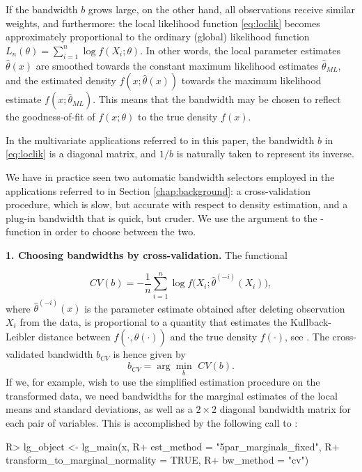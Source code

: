 If the bandwidth \(b\) grows large, on the other hand, all observations receive similar weights, and furthermore: the local likelihood function \eqref{eq:loclik} becomes approximately proportional to the ordinary (global) likelihood function \(L_n(\theta) = \sum_{i=1}^n\log f(X_i;\theta)\). In other words, the local parameter estimates \(\widehat \theta(x)\) are smoothed towards the constant maximum likelihood estimates \(\widehat\theta_{ML}\), and the estimated density \(f(x;\widehat\theta(x))\) towards the maximum likelihood estimate \(f(x;\widehat\theta_{ML})\). This means that the bandwidth may be chosen to reflect the goodness-of-fit of \(f(x;\theta)\) to the true density \(f(x)\).

In the multivariate applications referred to in this paper, the bandwidth \(b\) in \eqref{eq:loclik} is a diagonal matrix, and \(1/b\) is
naturally taken to represent its inverse. 

We have in practice seen two automatic bandwidth selectors employed in the applications referred to in Section \ref{chap:background}: a
cross-validation procedure, which is slow, but accurate with respect to density estimation, and a plug-in bandwidth that is quick, but cruder. We use the argument
 to the -function in order to choose between the two.

\textbf{1. Choosing bandwidths by cross-validation.} The functional

\[CV(b) = -\frac{1}{n}\sum_{i=1}^n \log f\Big(X_i; \widehat\theta^{(-i)}(X_i)\Big),\]
where \(\widehat\theta^{(-i)}(x)\) is the parameter estimate obtained after deleting observation \(X_i\) from the data, is proportional to a quantity that estimates the Kullback-Leibler distance between \(f(\cdot, \widehat\theta(\cdot))\) and the true density \(f(\cdot)\), see \citet{bere:tjos:2014}. The cross-validated bandwidth \(b_{CV}\) is hence given by \[b_{CV} = \arg\min_b \,\, CV(b).\] If we, for example, wish to use the simplified estimation procedure on the transformed data, we need bandwidths for the marginal estimates of the local means and standard deviations, as well as a \(2\times2\) diagonal bandwidth matrix for each pair of variables. This is accomplished by the following call to :

\begin{example}
R> lg_object <- lg_main(x,
R+                      est_method = "5par_marginals_fixed",
R+                      transform_to_marginal_normality = TRUE,
R+                      bw_method = "cv")
\end{example}

